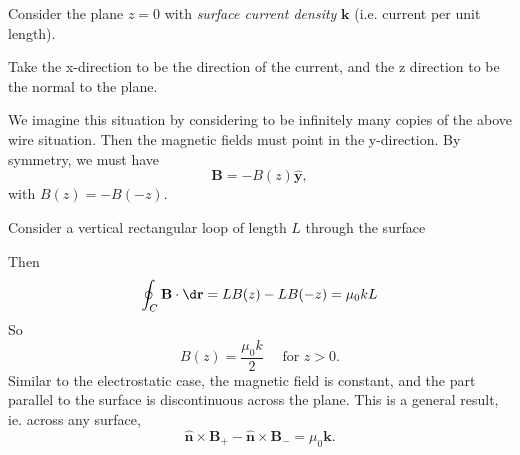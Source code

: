 \documentclass[a4paper]{article}
\begin{document}
\begin{eg}
  Consider the plane $z = 0$ with \emph{surface current density} $\mathbf{k}$ (i.e. current per unit length).
  \begin{center}
  \end{center}

  Take the x-direction to be the direction of the current, and the z direction to be the normal to the plane.

  We imagine this situation by considering to be infinitely many copies of the above wire situation. Then the magnetic fields must point in the y-direction. By symmetry, we must have
  \[
    \mathbf{B} = -B(z) \hat{\mathbf{y}},
  \]
  with $B(z) = -B(-z)$.

  Consider a vertical rectangular loop of length $L$ through the surface
  \begin{center}
  \end{center}
  Then
  \[
    \oint_C \mathbf{B}\cdot \d \mathbf{r} = LB(z) - LB(-z) = \mu_0 kL
  \]
  So
  \[
    B(z) = \frac{\mu_0 k}{2}\quad\text{ for }z > 0.
  \]
  Similar to the electrostatic case, the magnetic field is constant, and the part parallel to the surface is discontinuous across the plane. This is a general result, ie. across any surface,
  \[
    \hat {\mathbf{n}} \times \mathbf{B}_+ - \hat{\mathbf{n}}\times \mathbf{B}_{-} = \mu_0 \mathbf{k}.
  \]
\end{eg}
\end{document}

